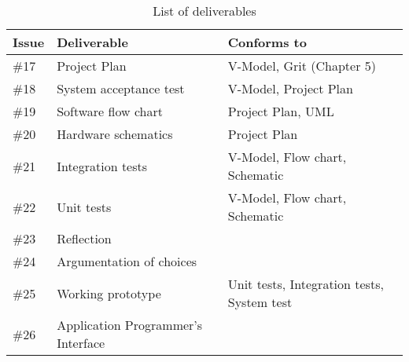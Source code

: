 \begin{table}
\centering
\begin{adjustwidth}{-0.5in}{0.5in}
\centering
\begin{tabular}{lll}
\hline Issue & Deliverable & Conforms to \\\hline
\hline
\#17 & Project Plan & V-Model\cite{vmodel}, Grit (Chapter 5)\cite{grit} \\
\#18 & System acceptance test & V-Model\cite{vmodel}, Project Plan \\
\#19 & Software flow chart & Project Plan, UML\cite{uml} \\
\#20 & Hardware schematics & Project Plan \\
\#21 & Integration tests & V-Model\cite{vmodel}, Flow chart, Schematic \\
\#22 & Unit tests & V-Model\cite{vmodel}, Flow chart, Schematic \\
\#23 & Reflection \\
\#24 & Argumentation of choices \\
\#25 & Working prototype & Unit tests, Integration tests, System test \\
\#26 & Application Programmer's Interface \\
\hline
\end{tabular}
\end{adjustwidth}
\caption{List of deliverables}
\label{tab:vmodeldeliverables}
\end{table}

